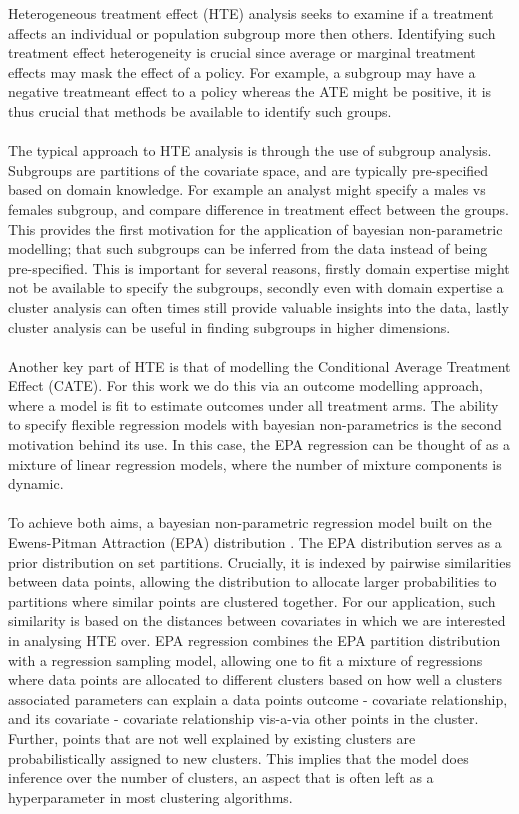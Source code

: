 \documentclass{article}
\begin{document}
Heterogeneous treatment effect (HTE) analysis seeks to examine if a treatment affects an individual or population subgroup more then others. Identifying such treatment effect heterogeneity is crucial since average or marginal treatment effects may mask the effect of a policy. For example, a subgroup may have a negative treatmeant effect to a policy whereas the ATE might be positive, it is thus crucial that methods be available to identify such groups. 
\\ \\
The typical approach to HTE analysis is through the use of subgroup analysis. Subgroups are partitions of the covariate space, and are typically pre-specified based on domain knowledge. For example an analyst might specify a males vs females subgroup, and compare difference in treatment effect between the groups. This provides the first motivation for the application of bayesian non-parametric modelling; that such subgroups can be inferred from the data instead of being pre-specified. This is important for several reasons, firstly domain expertise might not be available to specify the subgroups, secondly even with domain expertise a cluster analysis can often times still provide valuable insights into the data, lastly cluster analysis can be useful in finding subgroups in higher dimensions.
\\ \\ 
Another key part of HTE is that of modelling the Conditional Average Treatment Effect (CATE). For this work we do this via an outcome modelling approach, where a model is fit to estimate outcomes under all treatment arms. The ability to specify flexible regression models with bayesian non-parametrics is the second motivation behind its use. In this case, the EPA regression can be thought of as a mixture of linear regression models, where the number of mixture components is dynamic. 
\\ \\
To achieve both aims, a bayesian non-parametric regression model built on the Ewens-Pitman Attraction (EPA) distribution \cite{dahl2017random}. The EPA distribution serves as a prior distribution on set partitions. Crucially, it is indexed by pairwise similarities between data points, allowing the distribution to allocate larger probabilities to partitions where similar points are clustered together. For our application, such similarity is based on the distances between covariates in which we are interested in analysing HTE over. EPA regression combines the EPA partition distribution with a regression sampling model, allowing one to fit a mixture of regressions where data points are allocated to different clusters based on how well a clusters associated parameters can explain a data points outcome - covariate relationship, and its covariate - covariate relationship vis-a-via other points in the cluster. Further, points that are not well explained by existing clusters are probabilistically assigned to new clusters. This implies that the model does inference over the number of clusters, an aspect that is often left as a hyperparameter in most clustering algorithms.
\end{document}
